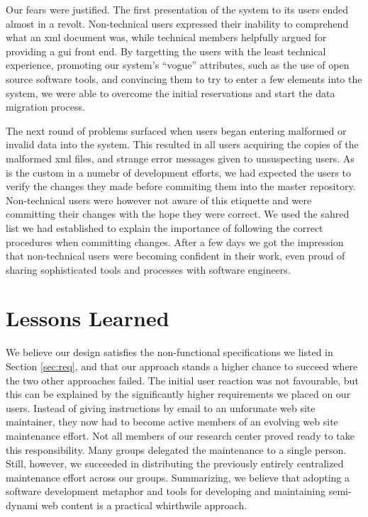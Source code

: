 \documentclass[10pt]{article}
\begin{document}
Our fears were justified.
The first presentation of the system to its users ended
almost in a revolt.
Non-technical users expressed their inability to comprehend
what an {\sc xml} document was, while technical members
helpfully argued for providing a {\sc gui} front end.
By targetting the users with the least technical experience,
promoting our system's ``vogue'' attributes,
such as the use of open source software tools,
and convincing them to try to enter a few elements into
the system, we were able to overcome the initial reservations
and start the data migration process.

The next round of problems surfaced when users began entering
malformed or invalid data into the system.
This resulted in all users acquiring the copies of the malformed
{\sc xml} files, and strange error messages given to unsuspecting
users.
As is the custom in a numebr of development efforts, we had
expected the users to verify the changes they made before
commiting them into the master repository.
Non-technical users were however not aware of this etiquette
and were committing their changes with the hope they were correct.
We used the sahred list we had established to explain the
importance of following the correct procedures when committing changes.
After a few days we got the impression that non-technical users
were becoming confident in their work, even proud of sharing
sophisticated tools and processes with software engineers.

\section{Lessons Learned}
\label{sec:concl}
We believe our design satisfies the non-functional specifications
we listed in Section \ref{sec:req},
and that our approach stands a higher chance to succeed where the
two other approaches failed.
The initial user reaction was not favourable, but this can
be explained by the significantly higher requirements we
placed on our users.
Instead of giving instructions by email to an unforunate
web site maintainer, they now had to become active members
of an evolving web site maintenance effort.
Not all members of our research center proved ready to take
this responsibility.
Many groups delegated the maintenance to a single person.
Still, however, we succeeded in distributing the previously
entirely centralized maintenance effort across our groups.
Summarizing, we believe that adopting a software development
metaphor and tools for developing and maintaining semi-dynami
web content is a practical whirthwile approach.



\end{document}
